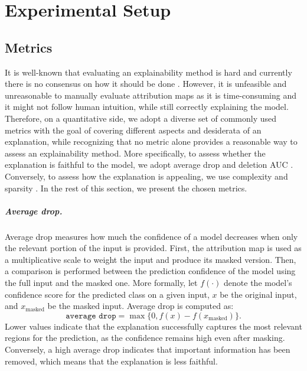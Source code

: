 \chapter{Experimental Setup} \label{ch:setup}



\section{Metrics}

It is well-known that evaluating an explainability method is hard and currently there is no consensus on how it should be done \cite{L_fstr_m_2022}. However, it is unfeasible and unreasonable to manually evaluate attribution maps as it is time-consuming and it might not follow human intuition, while still correctly explaining the model. Therefore, on a quantitative side, we adopt a diverse set of commonly used metrics \cite{gevaert2024evaluating} with the goal of covering different aspects and desiderata of an explanation, while recognizing that no metric alone provides a reasonable way to assess an explainability method. More specifically, to assess whether the explanation is faithful to the model, we adopt average drop \cite{gradcam_plusplus} and deletion AUC \cite{deletion_auc}. Conversely, to assess how the explanation is appealing, we use complexity \cite{complexity_metric} and sparsity \cite{sparsity_metric}. In the rest of this section, we present the chosen metrics.


\paragraph{Average drop.}
Average drop \cite{gradcam_plusplus} measures how much the confidence of a model decreases when only the relevant portion of the input is provided. First, the attribution map is used as a multiplicative scale to weight the input and produce its masked version. Then, a comparison is performed between the prediction confidence of the model using the full input and the masked one. More formally, let $f(\cdot)$ denote the model’s confidence score for the predicted class on a given input, $x$ be the original input, and $x_{\text{masked}}$ be the masked input. Average drop is computed as:
\begin{equation}
    \texttt{average drop} = \max\Big\{ 0, f(x) - f(x_{\text{masked}}) \Big\}.
\end{equation}
Lower values indicate that the explanation successfully captures the most relevant regions for the prediction, as the confidence remains high even after masking. Conversely, a high average drop indicates that important information has been removed, which means that the explanation is less faithful.


